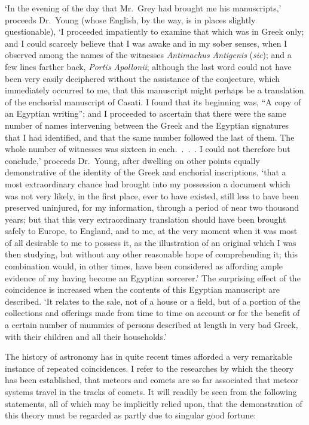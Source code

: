 \documentclass[letterpaper,12pt,oneside,openany]{memoir}
\begin{document}
`In the evening of the day that Mr.~Grey had
brought me his manuscripts,' proceeds Dr.~Young
(whose English, by the way, is in places slightly
questionable), `I proceeded impatiently to examine
that which was in Greek only; and I could scarcely
believe that I was awake and in my sober senses,
when I observed among the names of the witnesses
\textit{Antimachus Antigenis} (\textit{sic}); and a few lines farther
back, \textit{Portis Apollonii}; although the last word could
not have been very easily deciphered without the
assistance of the conjecture, which immediately occurred
to me, that this manuscript might perhaps be a
translation of the enchorial manuscript of Casati. I
found that its beginning was, ``A copy of an Egyptian
writing''; and I proceeded to ascertain that there were
the same number of names intervening between the
Greek and the Egyptian signatures that I had identified,
and that the same number followed the last of
them. The whole number of witnesses was sixteen
in each.~.~.~. I could not therefore but conclude,'
proceeds Dr.~Young, after dwelling on other points
equally demonstrative of the identity of the Greek and
enchorial inscriptions, `that a most extraordinary
chance had brought into my possession a document
which was not very likely, in the first place, ever to
have existed, still less to have been preserved uninjured,
for my information, through a period of near
two thousand years; but that this very extraordinary
translation should have been brought safely to Europe,
to England, and to me, at the very moment when it
was most of all desirable to me to possess it, as the
illustration of an original which I was then studying,
but without any other reasonable hope of comprehending
it; this combination would, in other times,
have been considered as affording ample evidence of
my having become an Egyptian sorcerer.' The surprising
effect of the coincidence is increased when the
contents of this Egyptian manuscript are described.
`It relates to the sale, not of a house or a field, but of
a portion of the collections and offerings made from
time to time on account or for the benefit of a certain
number of mummies of persons described at length
in very bad Greek, with their children and all their
households.'

The history of astronomy has in quite recent times
afforded a very remarkable instance of repeated coincidences.
I refer to the researches by which the
theory has been established, that meteors and comets
are so far associated that meteor systems travel in the
tracks of comets. It will readily be seen from the
following statements, all of which may be implicitly
relied upon, that the demonstration of this theory must
be regarded as partly due to singular good fortune:
\end{document}
